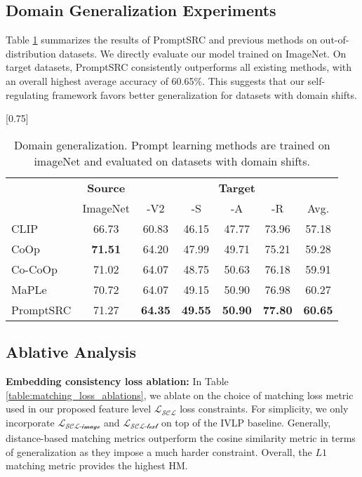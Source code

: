 \documentclass[10pt,twocolumn,letterpaper]{article}
\begin{document}
\subsection{Domain Generalization Experiments}
Table \ref{tab:robustness} summarizes the results of PromptSRC and previous methods on out-of-distribution datasets. We directly evaluate our model trained on ImageNet. On target datasets, PromptSRC consistently outperforms all existing methods, with an overall highest average accuracy of 60.65\%. This suggests that our self-regulating framework favors better generalization for datasets with domain shifts.
\begin{table}[!t]

    \small \centering
 \setlength{\tabcolsep}{8pt}
    \scalebox{0.75}[0.75]{
    \begin{tabular}{l cccccc}
    \toprule
    & \textbf{Source} & \multicolumn{5}{c}{\textbf{Target}} \\ \cmidrule(lr){2-2} \cmidrule(lr){3-7}
     & ImageNet & -V2 & -S & -A & -R  & Avg.\\
    \midrule
    CLIP &  66.73 & 60.83 & {46.15} & 47.77 & {73.96} & {57.18} \\
    CoOp &  \textbf{71.51} & {64.20} & 47.99  & 49.71  & 75.21  & {59.28} \\
    Co-CoOp & 71.02 & {64.07} & 48.75 & 50.63 & 76.18 & {59.91}  \\
        MaPLe & 70.72  & {64.07} & 49.15  & 50.90 & 76.98 & {60.27}  \\
    \midrule
    \rowcolor{tabhighlight} PromptSRC & 71.27 & \textbf{{64.35}} & \textbf{49.55} & \textbf{50.90}  & \textbf{77.80} & \textbf{60.65} \\
    \bottomrule
    \end{tabular}}\vspace{-0.5em}
        \caption{\textnormal{Domain generalization. }Prompt learning methods are trained on imageNet and evaluated on datasets with domain shifts.} 
    \label{tab:robustness}
    \vspace{-1em}
\end{table} 

\subsection{Ablative Analysis}
\label{sec:experiments:ablation_experiments}


\noindent \textbf{Embedding consistency loss ablation:}
In Table \ref{table:matching_loss_ablations}, we ablate on the choice of matching loss metric used in our proposed feature level $\mathcal{L_{\text{SCL}}}$ loss constraints. For simplicity, we only incorporate $\mathcal{L_{\text{SCL-image}}}$ and $\mathcal{L_{\text{SCL-text}}}$ on top of the IVLP baseline. Generally, distance-based matching metrics outperform the cosine similarity metric in terms of generalization as they impose a much harder constraint. Overall, the $L1$ matching metric provides the highest HM.
\end{document}

